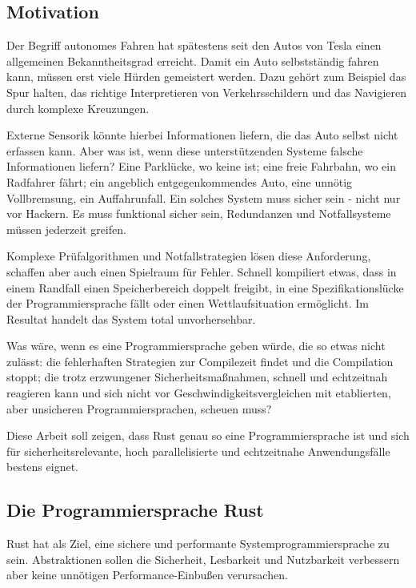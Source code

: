 \begin{multicols}{2}

\subsection*{Motivation}

Der Begriff autonomes Fahren hat spätestens seit den Autos von Tesla einen allgemeinen Bekanntheitsgrad erreicht. Damit ein Auto selbstständig fahren kann, müssen erst viele Hürden gemeistert werden.
Dazu gehört zum Beispiel das Spur halten, das richtige Interpretieren von Verkehrsschildern und das Navigieren durch komplexe Kreuzungen.

Externe Sensorik könnte hierbei Informationen liefern, die das Auto selbst nicht erfassen kann.
Aber was ist, wenn diese unterstützenden Systeme falsche Informationen liefern?
Eine Parklücke, wo keine ist; eine freie Fahrbahn, wo ein Radfahrer fährt; ein angeblich entgegenkommendes Auto, eine unnötig Vollbremsung, ein Auffahrunfall.
Ein solches System muss sicher sein - nicht nur vor Hackern.
Es muss funktional sicher sein, Redundanzen und Notfallsysteme müssen jederzeit greifen.

Komplexe Prüfalgorithmen und Notfallstrategien lösen diese Anforderung, schaffen aber auch einen Spielraum für Fehler.
Schnell kompiliert etwas, dass in einem Randfall einen Speicherbereich doppelt freigibt, in eine Spezifikationslücke der Programmiersprache fällt oder einen Wettlaufsituation ermöglicht.
Im Resultat handelt das System total unvorhersehbar.

Was wäre, wenn es eine Programmiersprache geben würde, die so etwas nicht zulässt: die fehlerhaften Strategien zur Compilezeit findet und die Compilation stoppt; die trotz erzwungener Sicherheitsmaßnahmen, schnell und echtzeitnah reagieren kann und sich nicht vor Geschwindigkeitsvergleichen mit etablierten, aber unsicheren Programmiersprachen, scheuen muss?

Diese Arbeit soll zeigen, dass Rust genau so eine Programmiersprache ist und sich für sicherheitsrelevante, hoch parallelisierte und echtzeitnahe Anwendungsfälle bestens eignet.

\subsection*{Die Programmiersprache Rust}

Rust hat als Ziel, eine sichere und performante Systemprogrammiersprache zu sein.
Abstraktionen sollen die Sicherheit, Lesbarkeit und Nutzbarkeit verbessern aber keine unnötigen Performance-Einbußen verursachen.


\end{multicols}
